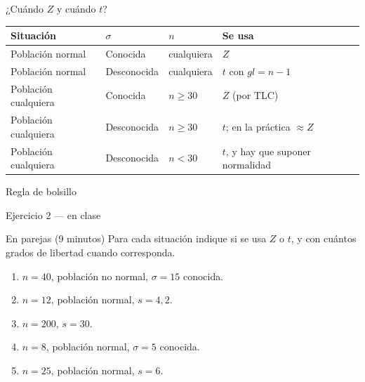 \documentclass[aspectratio=169,10pt]{beamer}
\begin{document}
\begin{frame}{¿Cuándo $Z$ y cuándo $t$?}
  \footnotesize
  \begin{center}
  \begin{tabular}{@{}llll@{}}
    \toprule
    \textbf{Situación} & \textbf{$\sigma$} & \textbf{$n$} & \textbf{Se usa} \\
    \midrule
    Población normal & Conocida   & cualquiera & $Z$ \\
    Población normal & Desconocida & cualquiera & $t$ con $gl=n-1$ \\
    Población cualquiera & Conocida & $n\ge 30$ & $Z$ (por TLC) \\
    Población cualquiera & Desconocida & $n\ge 30$ & $t$; en la práctica
      $\approx Z$ \\
    Población cualquiera & Desconocida & $n<30$ & $t$, y hay que suponer
      normalidad \\
    \bottomrule
  \end{tabular}
  \end{center}

  \vspace{0.25cm}
  \begin{alertblock}{Regla de bolsillo}
    \footnotesize
  \end{alertblock}
\end{frame}

\begin{frame}{Ejercicio 2 — en clase}
  \begin{alertblock}{En parejas (9 minutos)}
    Para cada situación indique si se usa $Z$ o $t$, y con cuántos grados de
    libertad cuando corresponda.

    \vspace{0.25cm}
    \begin{enumerate}
      \item $n=40$, población no normal, $\sigma=15$ conocida.
      \item $n=12$, población normal, $s=4{,}2$.
      \item $n=200$, $s=30$.
      \item $n=8$, población normal, $\sigma=5$ conocida.
      \item $n=25$, población normal, $s=6$.
    \end{enumerate}
  \end{alertblock}
\end{frame}
\end{document}
